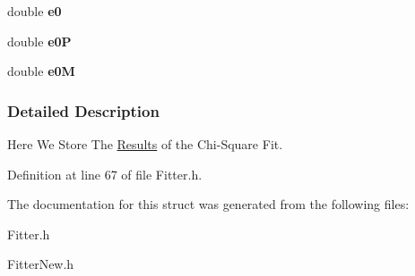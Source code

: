\begin{DoxyCompactItemize}
\item 
\hypertarget{structResults_a44f8bd621620d8e8bd52cc39e188bb01}{
double {\bfseries e0}}
\label{structResults_a44f8bd621620d8e8bd52cc39e188bb01}

\item 
\hypertarget{structResults_a4e532a1c2d1f7b0e229f50dfcc1a8a69}{
double {\bfseries e0P}}
\label{structResults_a4e532a1c2d1f7b0e229f50dfcc1a8a69}

\item 
\hypertarget{structResults_a517afd3bd09e446bc3323bd4a4142d6b}{
double {\bfseries e0M}}
\label{structResults_a517afd3bd09e446bc3323bd4a4142d6b}

\end{DoxyCompactItemize}


\subsubsection{Detailed Description}
Here We Store The \hyperlink{structResults}{Results} of the Chi-\/Square Fit. 

Definition at line 67 of file Fitter.h.



The documentation for this struct was generated from the following files:\begin{DoxyCompactItemize}
\item 
Fitter.h\item 
FitterNew.h\end{DoxyCompactItemize}
